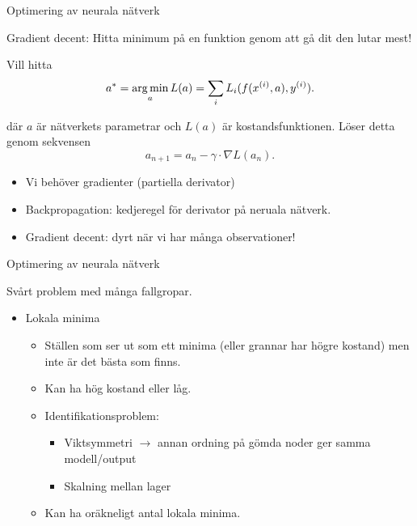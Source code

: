 \documentclass[10pt,english]{beamer}
\begin{document}
\begin{frame}{Optimering av neurala nätverk}
    
    Gradient decent: Hitta minimum på en funktion genom att gå dit den lutar mest!

    Vill hitta
    \begin{equation*}
        a^* = \operatorname*{arg\,min}_a L(a) = \sum_i L_i(f(x^{(i)},a), y^{(i)}).
    \end{equation*}

    där $a$ är nätverkets parametrar och $L(a)$ är kostandsfunktionen. Löser detta genom sekvensen
    \begin{equation*}
        a_{n+1} = a_n - \gamma \cdot \nabla L(a_n).
    \end{equation*}

    \begin{itemize}
        \item Vi behöver gradienter (partiella derivator) 
        \item Backpropagation: kedjeregel för derivator på neruala nätverk.
        \item Gradient decent: dyrt när vi har många observationer!
    \end{itemize}

\end{frame}

\begin{frame}{Optimering av neurala nätverk}
    
    Svårt problem med många fallgropar.

    \begin{itemize}
        \item Lokala minima
        \begin{itemize}
            \item Ställen som ser ut som ett minima (eller grannar har högre kostand) men inte är det bästa som finns.
            \item Kan ha hög kostand eller låg.
            \item Identifikationsproblem:
            \begin{itemize}
                \item Viktsymmetri $\rightarrow$ annan ordning på gömda noder ger samma modell/output
                \item Skalning mellan lager
            \end{itemize}
            \item Kan ha oräkneligt antal lokala minima.
        \end{itemize}
    \end{itemize}

\end{frame}
\end{document}
